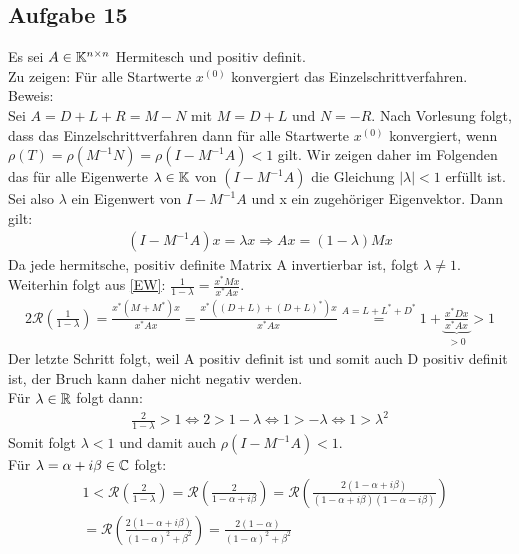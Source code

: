 \subsection*{Aufgabe 15}
Es sei $A \in \mathbb K^{n\times n}$ Hermitesch und positiv definit.\\
Zu zeigen: Für alle Startwerte $x^{(0)}$ konvergiert das Einzelschrittverfahren.\\
\newline
Beweis:\\
Sei $A=D+L+R=M-N$ mit $M=D+L$ und $N=-R$.
Nach Vorlesung folgt, dass das Einzelschrittverfahren dann für alle Startwerte $x^{(0)}$ konvergiert, wenn $\rho(T)=\rho(M^{-1}N) =\rho(I-M^{-1}A)<1$ gilt. Wir zeigen daher im Folgenden das für alle Eigenwerte $\lambda \in \mathbb K$ von $(I-M^{-1}A)$ die Gleichung $|\lambda|<1$ erfüllt ist.\\
\newline
Sei also $\lambda$ ein Eigenwert von $I-M^{-1}A$ und x ein zugehöriger Eigenvektor. Dann gilt:
\begin{align}\label{EW}
(I-M^{-1}A)x=\lambda x \Rightarrow Ax=(1-\lambda)Mx
\end{align}
Da jede hermitsche, positiv definite Matrix A invertierbar ist, folgt $\lambda \neq 1$.\\
Weiterhin folgt aus \eqref{EW}: $\frac{1}{1-\lambda}=\frac{x^*Mx}{x^*Ax}$.
\begin{align}
2\mathcal{R}\left(\frac{1}{1-\lambda}\right)=\frac{x^*(M+M^*)x}{x^*Ax}=\frac{x^*((D+L)+(D+L)^*)x}{x^*Ax}\overset{A=L+L^*+D^*}{=}1+\underbrace{\frac{x^*Dx}{x^*Ax}}_{>0}>1
\end{align}
Der letzte Schritt folgt, weil A positiv definit ist und somit auch D positiv definit ist, der Bruch kann daher nicht negativ werden.\\
\newline
Für $\lambda \in \mathbb R$ folgt dann:
\begin{align*}
\frac{2}{1-\lambda}>1\Leftrightarrow  2>1-\lambda
\Leftrightarrow 1>-\lambda \Leftrightarrow 1>\lambda^2
\end{align*}
Somit folgt $\lambda<1$ und damit auch $\rho(I-M^{-1}A)<1$.\\
\newline
Für $\lambda=\alpha +i\beta \in \mathbb C$ folgt:
\begin{align*}
&1<\mathcal{R}\left(\frac{2}{1-\lambda}\right)=\mathcal{R}\left(\frac{2}{1-\alpha+ i \beta}\right)=\mathcal{R}\left(\frac{2(1-\alpha+i \beta)}{(1-\alpha+ i \beta)(1-\alpha- i \beta)}\right)\\&=\mathcal{R}\left(\frac{2(1-\alpha+i \beta)}{(1-\alpha)^2+\beta^2}\right)=\frac{2(1-\alpha)}{(1-\alpha)^2+\beta^2}
\end{align*}

